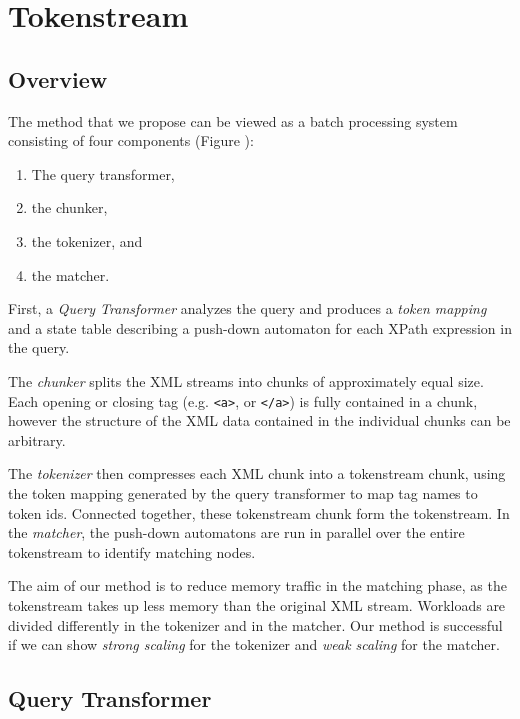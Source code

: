 \section{Tokenstream}\label{sec:yourmethod}


\subsection{Overview}

The method that we propose can be viewed as a batch processing system consisting
of four components (Figure ):

\begin{enumerate}
\item The query transformer,
\item the chunker,
\item the tokenizer, and
\item the matcher.
\end{enumerate}

First, a \emph{Query Transformer} analyzes the query and produces a \emph{token
mapping} and a state table describing a push-down automaton for each XPath
expression in the query.

The \emph{chunker} splits the XML streams into chunks of approximately equal
size. Each opening or closing tag (e.g. \verb;<a>;, or \verb;</a>;) is fully
contained in a chunk, however the structure of the XML data contained in the
individual chunks can be arbitrary.

The \emph{tokenizer} then compresses each XML chunk into a tokenstream chunk,
using the token mapping generated by the query transformer to map tag names to
token ids. Connected together, these tokenstream chunk form the tokenstream. In
the \emph{matcher}, the push-down automatons are run in parallel over the
entire tokenstream to identify matching nodes.

The aim of our method is to reduce memory traffic in the matching phase, as the
tokenstream takes up less memory than the original XML stream. Workloads are
divided differently in the tokenizer and in the matcher. Our method is
successful if we can show \emph{strong scaling} for the tokenizer and \emph{weak
scaling} for the matcher.

\subsection{Query Transformer}

